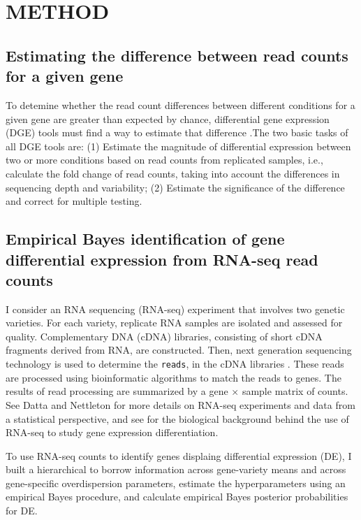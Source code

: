 
\chapter{METHOD}

\section{Estimating the difference between read counts for a given gene}

To detemine whether the read count differences between different conditions for a given gene are greater than expected by chance, differential gene expression (DGE) tools must find a way to estimate that difference \citep{dundar2015introduction}.The two basic tasks of all DGE tools are: (1) Estimate the magnitude of differential expression between two or more conditions based on read counts from replicated samples, i.e., calculate the fold change of read counts, taking into account the differences in sequencing depth and variability; (2) Estimate the significance of the difference and correct for multiple testing. 

\section{Empirical Bayes identification of gene differential expression from RNA-seq read counts}

I consider an RNA sequencing (RNA-seq) experiment that involves two genetic varieties. For each variety, replicate RNA samples are isolated and assessed for quality. Complementary DNA (cDNA) libraries, consisting of short cDNA fragments derived from RNA, are constructed. Then, next generation sequencing technology is used to determine the {\tt reads}, in the cDNA libraries \citep{niemi2015empirical}. These reads are processed using bioinformatic algorithms to match the reads to genes. The results of read processing are summarized by a gene $\times$ sample matrix of counts. See Datta and Nettleton \citep{datta2014statistical} for more details on RNA-seq experiments and data from a statistical perspective, and see \citep{paschold2012complementation} for the biological background behind the use of RNA-seq to study gene expression differentiation. 

To use RNA-seq counts to identify genes displaing differential expression (DE), I built a hierarchical to borrow information across gene-variety means and across gene-specific overdispersion parameters, estimate the hyperparameters using an empirical Bayes procedure, and calculate empirical Bayes posterior probabilities for DE. 

